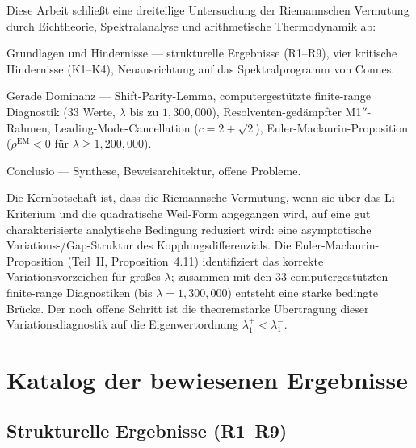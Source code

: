 \documentclass[12pt,a4paper]{article}
\theoremstyle{definition}
\theoremstyle{remark}
\begin{document}
Diese Arbeit schließt eine dreiteilige Untersuchung der Riemannschen Vermutung durch Eichtheorie, Spektralanalyse und arithmetische Thermodynamik ab:
\begin{description}[font=\bfseries,leftmargin=2em]
  \item[Teil~I \cite{Geiger2026partI}:] Grundlagen und Hindernisse --- strukturelle Ergebnisse (R1--R9), vier kritische Hindernisse (K1--K4), Neuausrichtung auf das Spektralprogramm von Connes.
  \item[Teil~II \cite{Geiger2026partII}:] Gerade Dominanz --- Shift-Parity-Lemma, computergestützte finite-range Diagnostik ($33$ Werte, $\lambda$ bis zu $1{,}300{,}000$), Resolventen-gedämpfter M1$''$-Rahmen, Leading-Mode-Cancellation ($c = 2 + \sqrt{2}$), Euler-Maclaurin-Proposition ($\rho^{\mathrm{EM}} < 0$ für $\lambda \geq 1{,}200{,}000$).
  \item[Teil~III (diese Arbeit):] Conclusio --- Synthese, Beweisarchitektur, offene Probleme.
\end{description}

Die Kernbotschaft ist, dass die Riemannsche Vermutung, wenn sie über das Li-Kriterium und die quadratische Weil-Form angegangen wird, auf eine gut charakterisierte analytische Bedingung reduziert wird: eine asymptotische Variations-/Gap-Struktur des Kopplungsdifferenzials. Die Euler-Maclaurin-Proposition (Teil~II, Proposition~4.11) identifiziert das korrekte Variationsvorzeichen für großes $\lambda$; zusammen mit den $33$ computergestützten finite-range Diagnostiken (bis $\lambda = 1{,}300{,}000$) entsteht eine starke bedingte Brücke. Der noch offene Schritt ist die theoremstarke Übertragung dieser Variationsdiagnostik auf die Eigenwertordnung $\lambda_1^+<\lambda_1^-$.


\section{Katalog der bewiesenen Ergebnisse}
\label{sec:catalog}

\subsection{Strukturelle Ergebnisse (R1--R9)}
\end{document}
